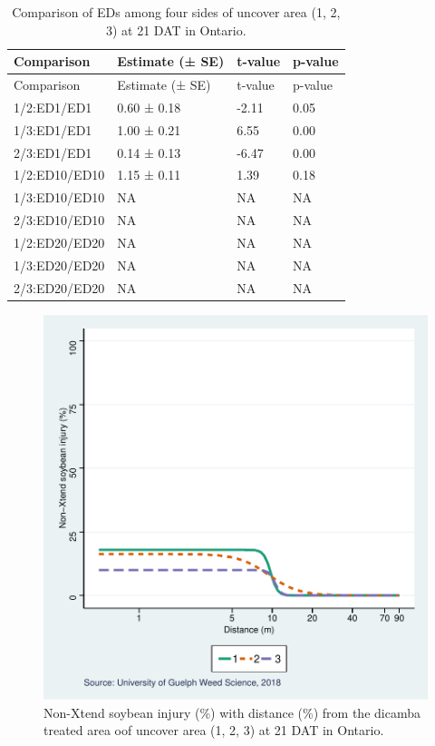 \documentclass[]{article}
\begin{document}
\begin{longtable}[]{@{}llll@{}}
\caption{Comparison of EDs among four sides of uncover area (1, 2, 3) at
21 DAT in Ontario.}\tabularnewline
\toprule
Comparison & Estimate (± SE) & t-value & p-value\tabularnewline
\midrule
\endfirsthead
\toprule
Comparison & Estimate (± SE) & t-value & p-value\tabularnewline
\midrule
\endhead
1/2:ED1/ED1 & 0.60 ± 0.18 & -2.11 & 0.05\tabularnewline
1/3:ED1/ED1 & 1.00 ± 0.21 & 6.55 & 0.00\tabularnewline
2/3:ED1/ED1 & 0.14 ± 0.13 & -6.47 & 0.00\tabularnewline
1/2:ED10/ED10 & 1.15 ± 0.11 & 1.39 & 0.18\tabularnewline
1/3:ED10/ED10 & NA & NA & NA\tabularnewline
2/3:ED10/ED10 & NA & NA & NA\tabularnewline
1/2:ED20/ED20 & NA & NA & NA\tabularnewline
1/3:ED20/ED20 & NA & NA & NA\tabularnewline
2/3:ED20/ED20 & NA & NA & NA\tabularnewline
\bottomrule
\end{longtable}

\begin{figure}
\centering
\includegraphics{Report_Dicamba_study_files/figure-latex/ONPlot-1.pdf}
\caption{Non-Xtend soybean injury (\%) with distance (\%) from the
dicamba treated area oof uncover area (1, 2, 3) at 21 DAT in Ontario.}
\end{figure}

\newpage

\pagebreak
\end{document}
